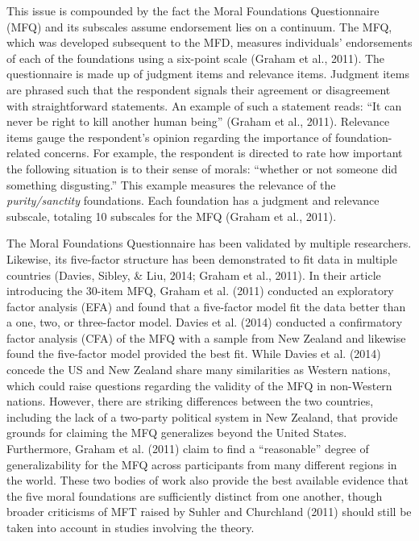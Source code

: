 \documentclass[english,,man]{apa6}
\begin{document}
This issue is compounded by the fact the Moral Foundations Questionnaire
(MFQ) and its subscales assume endorsement lies on a continuum. The MFQ,
which was developed subsequent to the MFD, measures individuals'
endorsements of each of the foundations using a six-point scale (Graham
et al., 2011). The questionnaire is made up of judgment items and
relevance items. Judgment items are phrased such that the respondent
signals their agreement or disagreement with straightforward statements.
An example of such a statement reads: \enquote{It can never be right to
kill another human being} (Graham et al., 2011). Relevance items gauge
the respondent's opinion regarding the importance of foundation-related
concerns. For example, the respondent is directed to rate how important
the following situation is to their sense of morals: \enquote{whether or
not someone did something disgusting.} This example measures the
relevance of the \emph{purity/sanctity} foundations. Each foundation has
a judgment and relevance subscale, totaling 10 subscales for the MFQ
(Graham et al., 2011).

The Moral Foundations Questionnaire has been validated by multiple
researchers. Likewise, its five-factor structure has been demonstrated
to fit data in multiple countries (Davies, Sibley, \& Liu, 2014; Graham
et al., 2011). In their article introducing the 30-item MFQ, Graham et
al. (2011) conducted an exploratory factor analysis (EFA) and found that
a five-factor model fit the data better than a one, two, or three-factor
model. Davies et al. (2014) conducted a confirmatory factor analysis
(CFA) of the MFQ with a sample from New Zealand and likewise found the
five-factor model provided the best fit. While Davies et al. (2014)
concede the US and New Zealand share many similarities as Western
nations, which could raise questions regarding the validity of the MFQ
in non-Western nations. However, there are striking differences between
the two countries, including the lack of a two-party political system in
New Zealand, that provide grounds for claiming the MFQ generalizes
beyond the United States. Furthermore, Graham et al. (2011) claim to
find a \enquote{reasonable} degree of generalizability for the MFQ
across participants from many different regions in the world. These two
bodies of work also provide the best available evidence that the five
moral foundations are sufficiently distinct from one another, though
broader criticisms of MFT raised by Suhler and Churchland (2011) should
still be taken into account in studies involving the theory.
\end{document}
